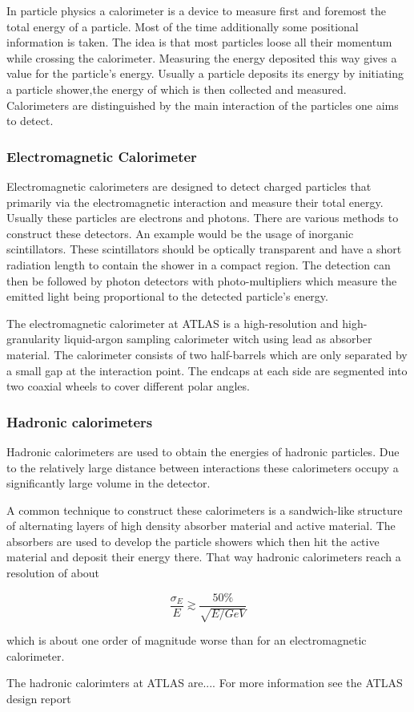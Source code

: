 In particle physics a calorimeter is a device to measure first and foremost the total energy of a particle. Most of the time additionally some positional information is taken.
The idea is that most particles loose all their momentum while crossing the calorimeter. Measuring the energy deposited this way gives a value for the particle's energy.
Usually a particle deposits its energy by initiating a particle shower,the energy of which is then collected and measured.
Calorimeters are distinguished by the main interaction of the particles one aims to detect. 
\subsubsection{Electromagnetic Calorimeter}

Electromagnetic calorimeters are designed to detect charged particles that primarily via the electromagnetic interaction and measure their total energy. Usually these particles are electrons and photons. There are various methods to construct these detectors. An example would be the usage of inorganic scintillators. These scintillators should be optically transparent and have a short radiation length to contain the shower in a compact region. The detection can then be followed by photon detectors with photo-multipliers which measure the emitted light being proportional to the detected particle's energy.

The electromagnetic calorimeter at ATLAS is a high-resolution and high-granularity liquid-argon sampling calorimeter witch using lead as absorber material. The calorimeter consists of two half-barrels which are only separated by a small gap at the interaction point. The endcaps at each side are segmented into two coaxial wheels to cover different polar angles.

\subsubsection{Hadronic calorimeters}

Hadronic calorimeters are used to obtain the energies of hadronic particles.
Due to the relatively large distance between interactions these calorimeters occupy a significantly large volume in the detector.

A common technique to construct these calorimeters is a sandwich-like structure of alternating layers of high density absorber material and active material. 
The absorbers are used to develop the particle showers which then hit the active material and deposit their energy there. That way hadronic calorimeters reach a resolution of about

\begin{equation}
\frac{\sigma_E}{E} \gtrsim \frac{50 \%}{\sqrt{E/GeV}}
\end{equation}

which is about one order of magnitude worse than for an electromagnetic calorimeter.

The hadronic calorimters at ATLAS are....
For more information see the ATLAS design report \cite{atlastdr}

